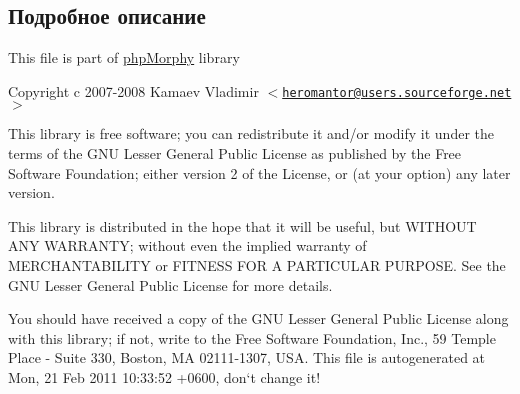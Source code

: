 \subsection{Подробное описание}
This file is part of \hyperlink{classphpMorphy}{phpMorphy} library

Copyright c 2007-\/2008 Kamaev Vladimir $<$\href{mailto:heromantor@users.sourceforge.net}{\tt heromantor@users.sourceforge.net}$>$

This library is free software; you can redistribute it and/or modify it under the terms of the GNU Lesser General Public License as published by the Free Software Foundation; either version 2 of the License, or (at your option) any later version.

This library is distributed in the hope that it will be useful, but WITHOUT ANY WARRANTY; without even the implied warranty of MERCHANTABILITY or FITNESS FOR A PARTICULAR PURPOSE. See the GNU Lesser General Public License for more details.

You should have received a copy of the GNU Lesser General Public License along with this library; if not, write to the Free Software Foundation, Inc., 59 Temple Place -\/ Suite 330, Boston, MA 02111-\/1307, USA. This file is autogenerated at Mon, 21 Feb 2011 10:33:52 +0600, don`t change it! 

